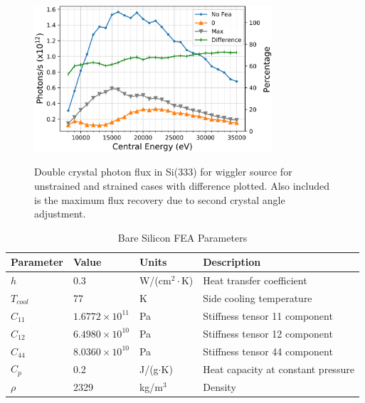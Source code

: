 \documentclass{iucr}
\begin{document}
\begin{figure}
\caption{Double crystal photon flux in Si(333) for wiggler source for unstrained and strained cases with difference plotted. Also included is the maximum flux recovery due to second crystal angle adjustment.}
\includegraphics[width = 8.85cm]{images/ivw333flux.png}
\label{fig:ivw333flux}
\end{figure}

\begin{table}

\caption{Bare Silicon FEA Parameters}
\begin{tabular}{@{}llll@{}}
Parameter   & Value                   & Units                     & Description                        \\
\hline
$h$         & 0.3                     & W/(cm$^2\cdot$K)          & Heat transfer coefficient          \\
$T_{cool}$  & 77                      & K                         & Side cooling temperature           \\
$C_{11}$    & $1.6772\times 10^{11}$  & Pa                        & Stiffness tensor 11 component      \\
$C_{12}$    & $6.4980\times 10^{10}$  & Pa                        & Stiffness tensor 12 component      \\
$C_{44}$    & $8.0360\times 10^{10}$  & Pa                        & Stiffness tensor 44 component      \\
$C_p$       & 0.2                     & J/(g$\cdot$K)               & Heat capacity at constant pressure \\
$\rho$      &  2329                   & kg/m$^3$                  & Density                            \\
\end{tabular}
\label{baresiliconFEA}
\end{table}
\end{document}
